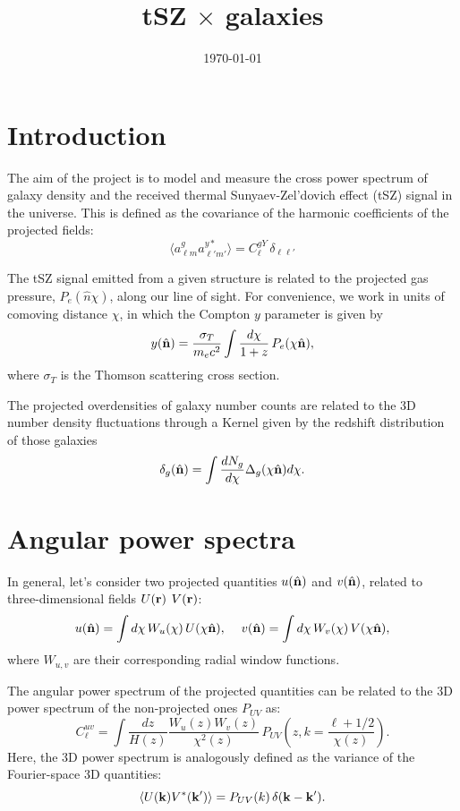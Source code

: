 \documentclass{article}
\title{tSZ $\times$ galaxies}
\date{\today}
\newcommand{\nv}{\hat{\bf n}}
\begin{document}
\maketitle

\section{Introduction}
The aim of the project is to model and measure the cross power spectrum of galaxy density and the received thermal Sunyaev-Zel'dovich effect (tSZ) signal in the universe. This is defined as the covariance of the harmonic coefficients of the projected fields:
\begin{equation}
  \langle a^g_{\ell m} a^{y*}_{\ell' m'} \rangle=C^{gY}_\ell\,\delta_{\ell\ell'}
\end{equation}

The tSZ signal emitted from a given structure is related to the projected gas pressure, $P_e(\hat{n} \chi)$, along our line of sight. For convenience, we work in units of comoving distance $\chi$, in which the Compton $y$ parameter is given by
\begin{equation}
  y(\nv) = \frac{\sigma_T}{m_e c^2} \int \frac{d\chi}{1+z}\,P_e(\chi\nv),
\end{equation}
where $\sigma_T$ is the Thomson scattering cross section.

The projected overdensities of galaxy number counts are related to the 3D number density fluctuations through a Kernel given by the redshift distribution of those galaxies
\begin{equation}
  \delta_g(\nv) = \int \frac{dN_g}{d\chi} \Delta_g(\chi\nv) d\chi.
\end{equation}

\section{Angular power spectra}
In general, let's consider two projected quantities $u(\nv)$ and $v(\nv)$, related to three-dimensional fields $U({\bf r})$ $V({\bf r})$:
\begin{equation}
  u(\nv)=\int d\chi\,W_u(\chi)\,U(\chi\nv),\hspace{12pt} v(\nv)=\int d\chi\,W_v(\chi)\,V(\chi\nv),
\end{equation}
where $W_{u,v}$ are their corresponding radial window functions.

The angular power spectrum of the projected quantities can be related to the 3D power spectrum of the non-projected ones $P_{UV}$ as:
\begin{equation}
  C_\ell^{uv} = \int \frac{dz}{H(z)} \frac{W_u(z)W_v(z)}{\chi^2(z)}\,P_{UV}\left( z, k=\frac{\ell+1/2}{\chi(z)} \right).
\end{equation}
Here, the 3D power spectrum is analogously defined as the variance of the Fourier-space 3D quantities:
\begin{equation}
  \left\langle U({\bf k})V^*({\bf k}')\right\rangle = P_{UV}(k)\,\delta({\bf k}-{\bf k}').
\end{equation}
\end{document}
